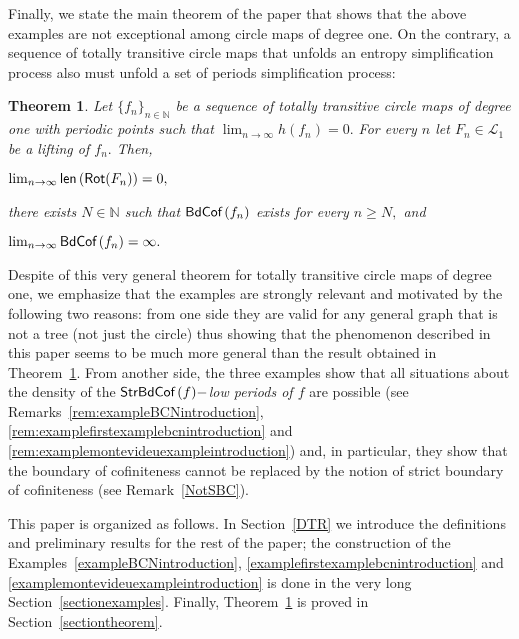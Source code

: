 \documentclass[a4paper, 11pt]{amsart}
\newenvironment{widthitemize}{\list{\textbullet}{\labelwidth=2ex\leftmargin=2.25ex}}{\endlist}
\numberwithin{equation}{section}
\newtheorem{MainTheorem}{Theorem}
\theoremstyle{customnumberedtheorem}
\theoremstyle{definitionwithbfnote}
\newcommand{\N}{\ensuremath{\mathbb{N}}}
\DeclareMathOperator{\bc}{\textsf{\upshape BdCof\,}}
\DeclareMathOperator{\sbc}{\textsf{\upshape StrBdCof\,}}
\DeclareMathOperator{\len}{\textsf{\upshape len}}
\DeclareMathOperator{\Rot}{\textsf{\upshape Rot}}
\newcommand{\dol}[1][1]{\ensuremath{\mathcal{L}_{#1}}}
\begin{document}
Finally, we state the main theorem of the paper that shows that the
above examples are not exceptional among circle maps of degree one.
On the contrary, a sequence of totally transitive circle maps
that unfolds an entropy simplification process also must unfold a
set of periods simplification process:

\begin{MainTheorem}\label{MTS1}
Let $\{f_n\}_{n\in \N}$ be a sequence of totally transitive circle maps
of degree one with periodic points such that
$\lim_{n\to\infty} h(f_n) = 0.$
For every $n$ let $F_n \in \dol$ be a lifting of $f_n.$
Then,
\begin{widthitemize}
\item $\lim_{n\to\infty} \len\left(\Rot(F_n)\right) = 0,$
\item there exists $N \in \N$ such that $\bc(f_n)$ exists for every $n \ge N,$ and
\item $\lim_{n\to\infty} \bc(f_n) = \infty.$
\end{widthitemize}
\end{MainTheorem}

Despite of this very general theorem for totally transitive circle
maps of degree one, we emphasize that the examples are strongly
relevant and motivated by the following two reasons:
from one side they are valid for any general graph that is not a tree
(not just the circle) thus showing that the phenomenon described in
this paper seems to be much more general than the result obtained in
Theorem~\ref{MTS1}. From another side, the three examples show that all
situations about the density of the \emph{$\sbc(f)-$low periods of $f$}
are possible (see Remarks~\ref{rem:exampleBCNintroduction},
\ref{rem:examplefirstexamplebcnintroduction} and
\ref{rem:examplemontevideuexampleintroduction}) and, in particular,
they show that the boundary of cofiniteness cannot be replaced by the
notion of strict boundary of cofiniteness (see Remark~\ref{NotSBC}).

This paper is organized as follows.
In Section~\ref{DTR} we introduce the definitions and preliminary
results for the rest of the paper;
the construction of the
Examples~\ref{exampleBCNintroduction},
         \ref{examplefirstexamplebcnintroduction} and
         \ref{examplemontevideuexampleintroduction}
is done in the very long Section~\ref{sectionexamples}.
Finally, Theorem~\ref{MTS1} is proved in Section~\ref{sectiontheorem}.

\end{document}
